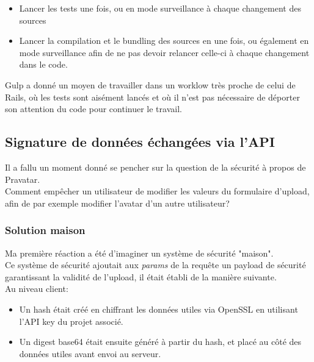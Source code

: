 \documentclass{report}
\begin{document}
        \begin{itemize}
          \item Lancer les tests une fois, ou en mode surveillance à chaque changement des sources
          \item Lancer la compilation et le bundling des sources en une fois, ou également en mode surveillance afin de ne pas devoir relancer celle-ci à chaque changement dans le code.\\
        \end{itemize}

        Gulp a donné un moyen de travailler dans un worklow très proche de celui de Rails, où les tests sont aisément lancés et où il n'est pas nécessaire de déporter
        son attention du code pour continuer le travail.\\

      \subsection{Signature de données échangées via l'API}
      \label{sub:Signature de données échangées via l'API}

        Il a fallu un moment donné se pencher sur la question de la sécurité à propos de Pravatar.\\
        Comment empêcher un utilisateur de modifier les valeurs du formulaire d'upload, afin de par exemple modifier l'avatar d'un autre utilisateur?\\

        \subsubsection{Solution maison}
        \label{subs:Solution maison}

          Ma première réaction a été d'imaginer un système de sécurité "maison".\\

          Ce système de sécurité ajoutait aux \textit{params} de la requête un payload de sécurité garantissant la validité de l'upload, il était établi de la manière suivante.\\

          Au niveau client:\\

          \begin{itemize}
            \item Un hash était créé en chiffrant les données utiles via OpenSSL en utilisant l'API key du projet associé.
            \item Un digest base64 était ensuite généré à partir du hash, et placé au côté des données utiles avant envoi au serveur.\\
          \end{itemize}
\end{document}
